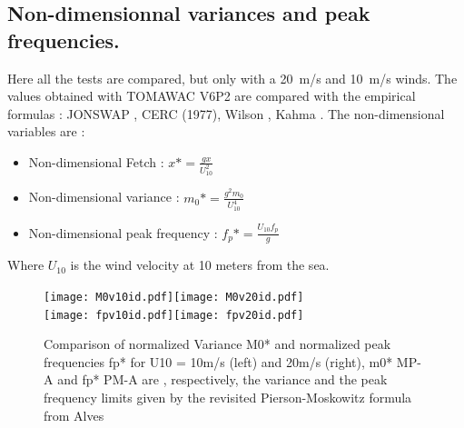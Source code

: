 \subsection{Non-dimensionnal variances and peak frequencies.}
Here all the tests are compared, but only with a 20~m/s and 10~m/s winds. The values obtained with TOMAWAC V6P2 are compared with the empirical formulas : JONSWAP \cite{Hasselmann1973}, CERC (1977)\cite {CERC77}, Wilson \cite{Wilson1965}, Kahma \cite{Kahma1992}. The non-dimensional variables are :\\
\begin{itemize}
\item Non-dimensional Fetch : $x* = \frac{g x}{U_{10}^2}$
\item Non-dimensional variance : $m_{0}* = \frac{g^2 m_{0}}{U_{10}^4}$
\item Non-dimensional peak frequency : $f_{p}* = \frac{U_{10} f_{p}}{g}$
\end{itemize}
Where $U_{10}$ is the wind velocity at 10 meters from the sea.\\
\begin{figure}[H]
  \centering
  	\texttt{[image: M0v10id.pdf]}\texttt{[image: M0v20id.pdf]}\\
  	\texttt{[image: fpv10id.pdf]}\texttt{[image: fpv20id.pdf]}\\
      \caption{Comparison of normalized Variance M0* and normalized peak frequencies fp* for U10 = 10m/s (left) and 20m/s (right), m0* MP-A and fp* PM-A are , respectively, the variance and the peak frequency limits given by the revisited Pierson-Moskowitz formula from Alves \cite{Alves2003}}
\label{variancefet}
\end{figure}

